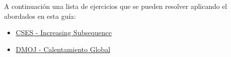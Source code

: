 A continuación una lista de ejercicios que se pueden resolver aplicando el abordados en esta guía:

\begin{itemize}
	\item \href{https://cses.fi/problemset/task/1145}{CSES - Increasing Subsequence}
	\item \href{https://dmoj.uclv.edu.cu/problem/glowar} {DMOJ - Calentamiento Global}
\end{itemize}